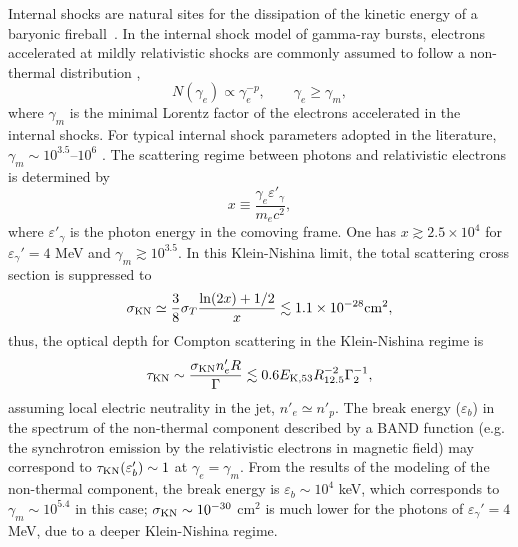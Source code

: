 \documentclass[linenumbers,twocolumn]{aastex631}
\begin{document}
Internal shocks are natural sites for the dissipation of the kinetic energy of a baryonic fireball~\citep[][]{1990ApJ...365L..55S,1992MNRAS.258P..41R,1993ApJ...405..278M,1994ApJ...430L..93R}.
In the internal shock model of gamma-ray bursts, electrons accelerated at mildly relativistic shocks are commonly assumed to follow a non-thermal distribution \citep{2004RvMP...76.1143P},
\begin{equation}
N(\gamma_e) \propto \gamma_e^{-p}, \qquad \gamma_e \ge \gamma_m ,
\end{equation}
where $\gamma_m$ is the minimal Lorentz factor of the electrons accelerated in the internal shocks.
For typical internal shock parameters adopted in the literature, $\gamma_m \sim 10^{3.5}$--$10^6$ \citep{2013ApJ...769...69B,2019A&A...628A..59O}. The scattering regime between photons and relativistic electrons is determined by
\begin{equation}
x \equiv \frac{\gamma_e \varepsilon'_\gamma}{m_e c^2},
\end{equation}
where $\varepsilon'_\gamma$ is the photon energy in the comoving frame. One has $x \gtrsim 2.5\times 10^4$ for $\varepsilon_\gamma'=4$ MeV and $\gamma_m\gtrsim10^{3.5}$. In this Klein-Nishina limit, the total scattering cross section is suppressed to \citep{1986rpa..book.....R}
\begin{equation}
\sigma_{\rm KN} \simeq 
\frac{3}{8}\sigma_T
\frac{\ln(2x)+1/2}{x} 
\lesssim 1.1 \times 10^{-28} {\rm cm}^2,
\label{eq:sigmaKN-GBM}
\end{equation}
thus, the optical depth for Compton scattering in the Klein-Nishina regime is 
\begin{equation}
\tau_{\rm KN} \sim \frac{\sigma_{\rm KN} n'_e R}{\Gamma}
\lesssim 0.6 E_{\rm K, 53}R_{12.5}^{-2} \Gamma_2^{-1},
\label{eq:tauKN-GBM}
\end{equation}
assuming local electric neutrality in the jet, $n'_{e}\simeq n'_p$. The break energy ($\varepsilon_b$) in the spectrum of the non-thermal component described by a BAND function (e.g. the synchrotron emission by the relativistic electrons in magnetic field) may correspond to $\tau_{\rm KN} (\varepsilon_b')\sim1$ at $\gamma_e=\gamma_m$. From the results of the modeling of the non-thermal component, the break energy is $\varepsilon_b\sim10^4$ keV, which corresponds to $\gamma_m\sim10^{5.4}$ in this case; $\sigma_{\rm KN}\sim10^{-30}$ cm$^{2}$ is much lower for the photons of $\varepsilon_\gamma'=4$ MeV, due to a deeper Klein-Nishina regime.
\end{document}
